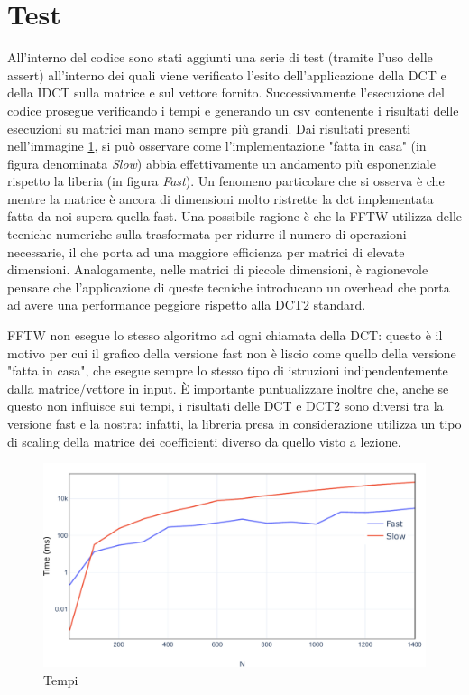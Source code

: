 \section{Test}

All'interno del codice sono stati aggiunti una serie di test (tramite l'uso delle assert) all'interno dei quali viene verificato l'esito dell'applicazione della DCT e della IDCT sulla matrice e sul vettore fornito. Successivamente l'esecuzione del codice prosegue verificando i tempi e generando un csv contenente i risultati delle esecuzioni su matrici man mano sempre più grandi. Dai risultati presenti nell'immagine \ref{fig:timings}, si può osservare come l'implementazione "fatta in casa" (in figura denominata \textit{Slow}) abbia effettivamente un andamento più esponenziale rispetto la liberia (in figura \textit{Fast}). Un fenomeno particolare che si osserva è che mentre la matrice è ancora di dimensioni molto ristrette la dct implementata fatta da noi supera quella fast. Una possibile ragione è che la FFTW utilizza delle tecniche numeriche sulla trasformata per ridurre il numero di operazioni necessarie, il che porta ad una maggiore efficienza per matrici di elevate dimensioni. Analogamente, nelle matrici di piccole dimensioni, è ragionevole pensare che l'applicazione di queste tecniche introducano un overhead che porta ad avere una performance peggiore rispetto alla DCT2 standard.

FFTW non esegue lo stesso algoritmo ad ogni chiamata della DCT: questo è il motivo per cui il grafico della versione fast non è liscio come quello della versione "fatta in casa", che esegue sempre lo stesso tipo di istruzioni indipendentemente dalla matrice/vettore in input.
È importante puntualizzare inoltre che, anche se questo non influisce sui tempi, i risultati delle DCT e DCT2 sono diversi tra la versione fast e la nostra: infatti, la libreria presa in considerazione utilizza un tipo di scaling della matrice dei coefficienti diverso da quello visto a lezione.

\begin{figure}[ht]
	\centering
	\includegraphics[scale=0.7]{figures/timings}
	\caption{Tempi}
	\label{fig:timings}	
\end{figure}

\FloatBarrier